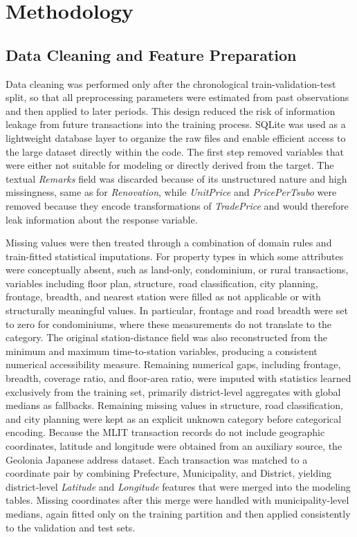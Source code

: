 \documentclass[12pt]{article}
\begin{document}
\section{Methodology}
\subsection{Data Cleaning and Feature Preparation}
Data cleaning was performed only after the chronological train-validation-test split, so that all preprocessing
parameters were estimated from past observations and then applied to later periods. This design reduced the risk of
information leakage from future transactions into the training process. SQLite was used as a lightweight database layer
to organize the raw files and enable efficient access to the large dataset directly within the code. The first step
removed variables that were either not suitable for modeling or directly derived from the target. The textual
\textit{Remarks} field was discarded because of its unstructured nature and high missingness, same as for
\textit{Renovation}, while \textit{UnitPrice} and \textit{PricePerTsubo} were removed because they encode
transformations of \textit{TradePrice} and would therefore leak information about the response variable.

Missing values were then treated through a combination of domain rules and train-fitted statistical imputations. For
property types in which some attributes were conceptually absent, such as land-only, condominium, or rural transactions,
variables including floor plan, structure, road classification, city planning, frontage, breadth, and nearest station
were filled as not applicable or with structurally meaningful values. In particular, frontage and road breadth were set
to zero for condominiums, where these measurements do not translate to the category. The original station-distance field
was also reconstructed from the minimum and maximum time-to-station variables, producing a consistent numerical
accessibility measure. Remaining numerical gaps, including frontage, breadth, coverage ratio, and floor-area ratio, were
imputed with statistics learned exclusively from the training set, primarily district-level aggregates with global
medians as fallbacks. Remaining missing values in structure, road classification, and city planning were kept as an
explicit unknown category before categorical encoding. Because the MLIT transaction records do not include geographic
coordinates, latitude and longitude were obtained from an auxiliary source, the Geolonia Japanese address dataset. Each
transaction was matched to a coordinate pair by combining Prefecture, Municipality, and District, yielding
district-level \textit{Latitude} and \textit{Longitude} features that were merged into the modeling tables. Missing
coordinates after this merge were handled with municipality-level medians, again fitted only on the training partition
and then applied consistently to the validation and test sets.
\end{document}
